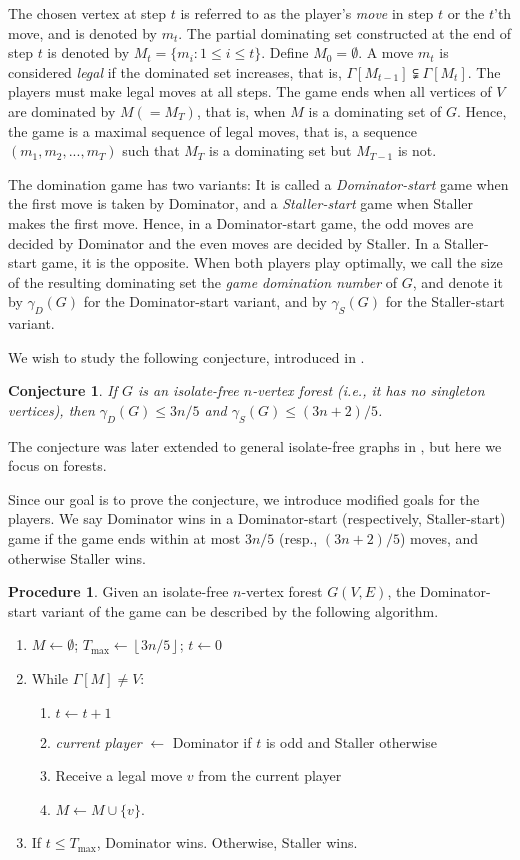 \documentclass[11pt]{article}
\def\dnsitem{\vspace{-7pt}\item}
\def\dnssubitem{\vspace{-5pt}\item}
\newtheorem{conjecture}{Conjecture}
\theoremstyle{definition}
\newtheorem{procedure}[theorem]{Procedure}
\begin{document}
The chosen vertex at step $t$ is referred to as the player's \emph{move} in step $t$ or the $t$'th move, and is denoted by $m_t$.
The partial dominating set constructed at the end of step $t$ is denoted by $M_t = \{m_i : 1 \leq i \leq t\}$. Define $M_0 = \emptyset$.
A move $m_t$ is considered \emph{legal} if the dominated set increases, that is, $\Gamma[M_{t-1}] \subsetneqq \Gamma[M_t]$.
The players must make legal moves at all steps. 
The game ends when all vertices of $V$ are dominated by $M ( = M_T)$, that is, when $M$ is a dominating set of $G$.
Hence, the game is a maximal sequence of legal moves, that is, a sequence $(m_1, m_2, ..., m_T)$ such that $M_T$ is a dominating set but $M_{T-1}$ is not.

The domination game has two variants:
It is called a \emph{Dominator-start} game when the first move is taken by Dominator, 
and a \emph{Staller-start} game when Staller makes the first move.
Hence, in a Dominator-start game, the odd moves are decided by Dominator and the even moves are decided by Staller.
In a Staller-start game, it is the opposite.
When both players play optimally, we call the size of the resulting dominating set the \emph{game domination number} of $G$, 
and denote it by $\gamma_D(G)$ for the Dominator-start variant, and by $\gamma_S(G)$ for the Staller-start variant.

We wish to study the following conjecture, introduced in \cite{kinnersley2013extremal}.
\begin{conjecture}
\label{conjecture:3_5}
If $G$ is an isolate-free $n$-vertex forest (i.e., it has no singleton vertices), then 
$\gamma_D(G) \leq 3n/5$ 
and 
$\gamma_S(G) \leq (3n+2)/5$.
\end{conjecture}
The conjecture was later extended to general isolate-free graphs in \cite{bujtas2015domination}, but here we focus on forests.

Since our goal is to prove the conjecture, we introduce modified goals for the players.
We say Dominator wins in a Dominator-start (respectively, Staller-start) game if the game ends within at most $3n/5$ (resp., $(3n+2)/5$) moves, and otherwise Staller wins.

\begin{procedure}
\label{proc:game_outline}
Given an isolate-free $n$-vertex forest $G(V,E)$, the Dominator-start variant of the game can be described by the following algorithm.
\begin{enumerate}
	\dnsitem $M \leftarrow \emptyset$;
              $T_{\max} \leftarrow \left\lfloor 3n / 5 \right\rfloor$;
	      $t \leftarrow 0$
	\dnsitem While $\Gamma[M] \neq V$:
	\begin{enumerate}
		\dnsitem $t \leftarrow t + 1$
		\dnssubitem \emph{current player} $\leftarrow$ Dominator if $t$ is odd and Staller otherwise
		\dnssubitem Receive a legal move $v$ from the current player
		\dnssubitem $M \leftarrow M \cup \{v\}$.
	\end{enumerate}
	\dnsitem If $t \leq T_{\max}$, Dominator wins. Otherwise, Staller wins.
\end{enumerate}
\end{procedure}
\end{document}
